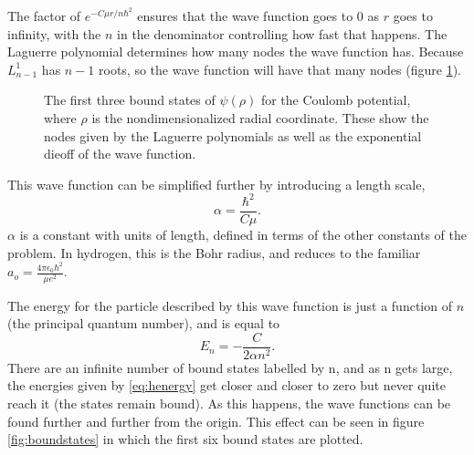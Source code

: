 \documentclass[12pt,twoside]{reedthesis}
\newcommand{\eqn}[1]{\begin{equation}#1\end{equation}}
\begin{document}
The factor of $e^{-C \mu r / n \hbar^2}$ ensures that the wave function goes to 0 as $r$ goes to infinity, with the $n$ in the denominator controlling how fast that happens. The Laguerre polynomial determines how many nodes the wave function has. Because $L^1_{n-1}$ has $n-1$ roots, so the wave function will have that many nodes (figure \ref{fig:wavefunctions}).
\begin{figure}[h]
\centering
{}
\caption{The first three bound states of $\psi(\rho)$ for the Coulomb potential, where $\rho$ is the nondimensionalized radial coordinate. These show the nodes given by the Laguerre polynomials as well as the exponential dieoff of the wave function.}
\label{fig:wavefunctions}
\end{figure}
This wave function can be simplified further by introducing a length scale, 
\eqn{
\alpha = \frac{\hbar^2}{C \mu}\mbox{.}
\label{eq:bohrradius}
}
$\alpha$ is a constant with units of length, defined in terms of the other constants of the problem. In hydrogen, this is the Bohr radius, and reduces to the familiar $a_o = \frac{4\pi \epsilon_0 \hbar^2}{\mu e^2}$. 

The energy for the particle described by this wave function is just a function of $n$ (the principal quantum number), and is equal to
\eqn{
E_n = -\frac{C}{2\alpha n^2}\mbox{.}
\label{eq:henergy}
}
There are an infinite number of bound states labelled by n, and as n gets large, the energies given by \eqref{eq:henergy} get closer and closer to zero but never quite reach it (the states remain bound). As this happens, the wave functions can be found further and further from the origin. This effect can be seen in figure \ref{fig:boundstates} in which the first six bound states are plotted.
\end{document}
